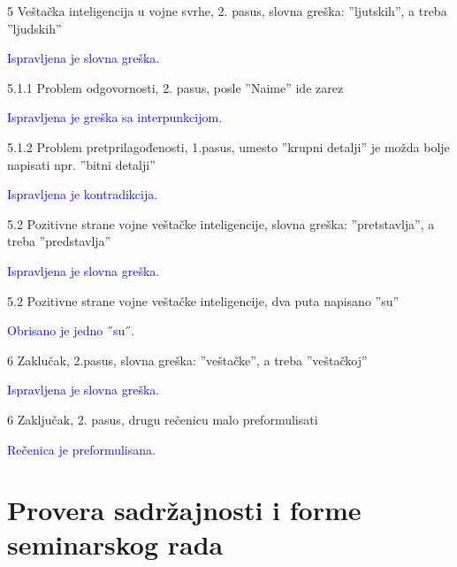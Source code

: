 \documentclass[a4paper]{report}
\newcommand{\odgovor}[1]{\textcolor{blue}{#1}}
\begin{document}
5 Veštačka inteligencija u vojne svrhe, 2. pasus, slovna greška: ''ljutskih'', a treba ''ljudskih''

\odgovor{Ispravljena je slovna greška.}

5.1.1 Problem odgovornosti, 2. pasus, posle ''Naime'' ide zarez

\odgovor{Ispravljena je greška sa interpunkcijom.}

5.1.2 Problem pretprilagođenosti, 1.pasus, umesto ''krupni detalji'' je možda bolje napisati npr. ''bitni detalji''

\odgovor{Ispravljena je kontradikcija.}

5.2 Pozitivne strane vojne veštačke inteligencije, slovna greška: ''pretstavlja'', a treba ''predstavlja''

\odgovor{Ispravljena je slovna greška.}

5.2 Pozitivne strane vojne veštačke inteligencije, dva puta napisano ''su''

\odgovor{Obrisano je jedno ˝su˝.}

6 Zaklučak, 2.pasus, slovna greška: ''veštačke'', a treba ''veštačkoj''

\odgovor{Ispravljena je slovna greška.}

6 Zaključak, 2. pasus, drugu rečenicu malo preformulisati

\odgovor{Rečenica je preformulisana.}

\section{Provera sadržajnosti i forme seminarskog rada}
\end{document}
